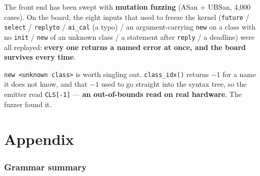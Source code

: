 \documentclass[11pt,a4paper]{article}
\begin{document}
The front end has been swept with \textbf{mutation fuzzing} (ASan + UBSan,
4{,}000 cases). On the board, the eight inputs that used to freeze the kernel
(\texttt{future} / \texttt{select} / \texttt{replyto} / \texttt{ai\_cal} (a
typo) / an argument-carrying \texttt{new} on a class with no \texttt{init} /
\texttt{new} of an unknown class / a statement after \texttt{reply} / a
deadline) were all replayed: \textbf{every one returns a named error at once,
and the board survives every time}.

\texttt{new <unknown class>} is worth singling out. \texttt{class\_idx()}
returns $-1$ for a name it does not know, and that $-1$ used to go straight
into the syntax tree, so the emitter read \texttt{CLS[-1]} --- \textbf{an
out-of-bounds read on real hardware}. The fuzzer found it.


\part{Appendix}
\label{part:appendix}

\section{Grammar summary}
\end{document}
